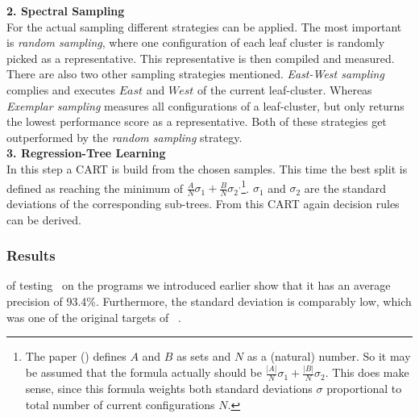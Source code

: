 \noindent
\textbf{2. Spectral Sampling}\\
\noindent
For the actual sampling different strategies can be applied.
The most important is \textit{random sampling}, where one configuration of each leaf cluster is randomly picked as a representative. This representative is then compiled and measured.\\
There are also two other sampling strategies mentioned. \textit{East-West sampling} complies and executes $East$ and $West$ of the current leaf-cluster. Whereas \textit{Exemplar sampling} measures all configurations of a leaf-cluster, but only returns the lowest performance score as a representative. Both of these strategies get outperformed by the \textit{random sampling} strategy.
\\

\noindent
\textbf{3. Regression-Tree Learning}\\
\noindent
In this step a CART is build from the chosen samples. This time the best split is defined as reaching the minimum of $\frac{A}{N}\sigma_1+\frac{B}{N}\sigma_2$$^,$\footnote{The paper (\cite{FasterDiscoveryofFasterSystemConfigurationsSiegmund2017}) defines $A$ and $B$ as sets and $N$ as a (natural) number. So it may be assumed that the formula actually should be $\frac{|A|}{N}\sigma_1+\frac{|B|}{N}\sigma_2$. This does make sense, since this formula weights both standard deviations $\sigma$ proportional to total number of current configurations $N$.}. $\sigma_1$ and $\sigma_2$ are the standard deviations of the corresponding sub-trees. From this CART again decision rules can be derived.

\subsubsection{\textnormal{Results}} of testing \WHAT~on the programs we introduced earlier show that it has an average precision of 93.4\%. Furthermore, the standard deviation is comparably low, which was one of the original targets of \WHAT~\cite{FasterDiscoveryofFasterSystemConfigurationsSiegmund2017}.